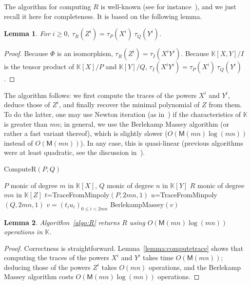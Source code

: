 \documentclass[12pt]{article}
\def\M {\ensuremath{\mathsf{M}}}
\def\K {\ensuremath{\mathbb{K}}}
\newtheorem{Lemma}{Lemma}
\begin{document}
The algorithm for computing $R$ is well-known (see for
instance~\cite{BoFlSaSc06}), and we just recall it here for
completeness. It is based on the following lemma.

\begin{Lemma}
  For $i \ge 0$, $\tau_R(Z^i) = \tau_P(X^i) \ \tau_Q(Y^i)$.
\end{Lemma}
\begin{proof}
  Because $\Phi$ is an isomorphism, $\tau_R(Z^i) = \tau_I(X^i
  Y^i)$. Because $\K[X,Y]/I$ is the tensor product of $\K[X]/P$ and
  $\K[Y]/Q$, $\tau_I(X^i Y^i)=\tau_P(X^i) \ \tau_Q(Y^i)$.
\end{proof}

The algorithm follows: we first compute the traces of the powers $X^i$
and $Y^i$, deduce those of $Z^i$, and finally recover the minimal
polynomial of $Z$ from them. To do the latter, one may use Newton
iteration (as in~\cite{Schoenhage82}) if the characteristics of $\K$
is greater than $mn$; in general, we use the Berlekamp Massey
algorithm (or rather a fast variant thereof), which is slightly slower
($O(\M(mn)\log(mn))$ instead of $O(\M(mn))$). In any case, 
this is quasi-linear (previous algorithms were at least quadratic,
see the discussion in~\cite{BoFlSaSc06}).

\begin{algorithm}[H]
  \caption{ComputeR$(P, Q)$}
  \begin{algorithmic}[1]
    \REQUIRE $P$ monic of degree $m$ in $\K[X]$, $Q$ monic of degree $n$ in $\K[Y]$
    \ENSURE $R$ monic of degree $mn$ in $\K[Z]$
    \STATE  $t$=TraceFromMinpoly$(P,2mn,1)$
    \STATE  $u$=TraceFromMinpoly$(Q,2mn,1)$
    \STATE $v=(t_i u_i)_{0 \le i < 2mn}$
    \RETURN BerlekampMassey$(v)$
  \end{algorithmic}
  \label{algo:R}
\end{algorithm}

\begin{Lemma}
  Algorithm~\ref{algo:R} returns $R$ using $O(\M(mn)\log(mn))$ operations in
  $\K$.
\end{Lemma}
\begin{proof}
  Correctness is straightforward.  Lemma~\ref{lemma:computetrace}
  shows that computing the traces of the powers $X^i$ and $Y^i$ takes
  time $O(\M(mn))$; deducing those of the powers $Z^i$ takes $O(mn)$
  operations, and the Berlekamp Massey algorithm costs
  $O(\M(mn)\log(mn))$ operations.
\end{proof}


\end{document}
